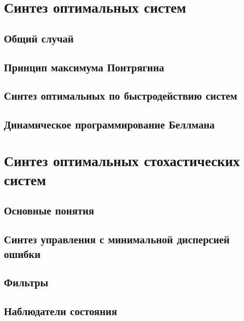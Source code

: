 \documentclass[preprint,russian,a5paper,10pt,twoside,mediummath]{ncc}
\begin{document}
  \section{Синтез оптимальных систем\label{synthesis}}
 \subsection{Общий случай\label{synthesis:general}}
 
 \subsection{Принцип максимума Понтрягина\label{synthesis:principle_of_maximum}}
 
 \subsection{Синтез оптимальных по быстродействию систем\label{synthesis:fastest}}
 
 \subsection{Динамическое программирование Беллмана\label{synthesis:dyn_prog}}
  
  \clearpage
  \section{Синтез оптимальных стохастических систем\label{stochastic}}
 \subsection{Основные понятия\label{stochastic:general}}
 
 \subsection{Синтез управления с минимальной дисперсией ошибки\label{stochastic:min_error_dispersion}}
 
 \subsection{Фильтры\label{stochastic:filters}}
 
 \subsection{Наблюдатели состояния\label{stochastic:observers}}
\end{document}
